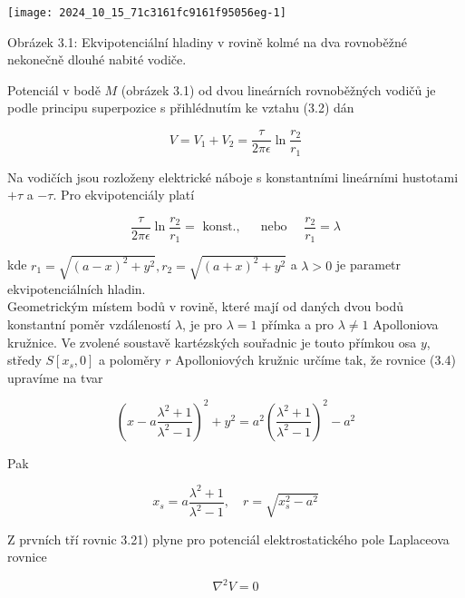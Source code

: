 \documentclass[10pt]{article}
\begin{document}
\begin{center}
\texttt{[image: 2024\_10\_15\_71c3161fc9161f95056eg-1]}
\end{center}

Obrázek 3.1: Ekvipotenciální hladiny v rovině kolmé na dva rovnoběžné nekonečně dlouhé nabité vodiče.

Potenciál v bodě $M$ (obrázek 3.1) od dvou lineárních rovnoběžných vodičů je podle principu superpozice s přihlédnutím ke vztahu (3.2) dán


\begin{equation*}
V=V_{1}+V_{2}=\frac{\tau}{2 \pi \epsilon} \ln \frac{r_{2}}{r_{1}} \tag{3.3}
\end{equation*}


Na vodičích jsou rozloženy elektrické náboje s konstantními lineárními hustotami $+\tau$ a $-\tau$. Pro ekvipotenciály platí


\begin{equation*}
\frac{\tau}{2 \pi \epsilon} \ln \frac{r_{2}}{r_{1}}=\text { konst., } \quad \text { nebo } \quad \frac{r_{2}}{r_{1}}=\lambda \tag{3.4}
\end{equation*}


kde $r_{1}=\sqrt{(a-x)^{2}+y^{2}}, r_{2}=\sqrt{(a+x)^{2}+y^{2}}$ a $\lambda>0$ je parametr ekvipotenciálních hladin.\\
Geometrickým místem bodů v rovině, které mají od daných dvou bodů konstantní poměr vzdáleností $\lambda$, je pro $\lambda=1$ přímka a pro $\lambda \neq 1$ Apolloniova kružnice. Ve zvolené soustavě kartézských souřadnic je touto přímkou osa $y$, středy $S\left[x_{s}, 0\right]$ a poloměry $r$ Apolloniových kružnic určíme tak, že rovnice (3.4) upravíme na tvar


\begin{equation*}
\left(x-a \frac{\lambda^{2}+1}{\lambda^{2}-1}\right)^{2}+y^{2}=a^{2}\left(\frac{\lambda^{2}+1}{\lambda^{2}-1}\right)^{2}-a^{2} \tag{3.5}
\end{equation*}


Pak


\begin{equation*}
x_{s}=a \frac{\lambda^{2}+1}{\lambda^{2}-1}, \quad r=\sqrt{x_{s}^{2}-a^{2}} \tag{3.6}
\end{equation*}


Z prvních tří rovnic 3.21) plyne pro potenciál elektrostatického pole Laplaceova rovnice


\begin{equation*}
\nabla^{2} V=0 \tag{3.7}
\end{equation*}
\end{document}
